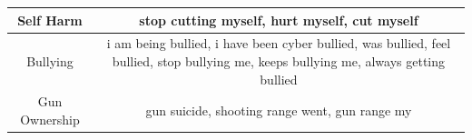 \documentclass[11pt]{article}
\begin{document}
\begin{table}
\begin{tabulary}{500pt}{|C|C|}
   Self Harm                             & stop cutting myself, hurt myself, cut myself                                                                                                                                                                                                                                                                                                                                                                                                                                                                                                                                                                                                                                                                                                                                                                                              \\ \hline
   Bullying                              & i am being bullied, i have been cyber bullied, was bullied, feel bullied, stop bullying me, keeps bullying me, always getting bullied                                                                                                                                                                                                                                                                                                                                                                                                                                                                                                                                                                                                                                                                                                     \\ \hline
   Gun Ownership                         & gun suicide, shooting range went, gun range my                                                                                                                                                                                                                                                                                                                                                                                                                                                                                                                                                                                                                                                                                                                                                                                            \\ \hline

\end{tabulary}
\end{table}
\end{document}
